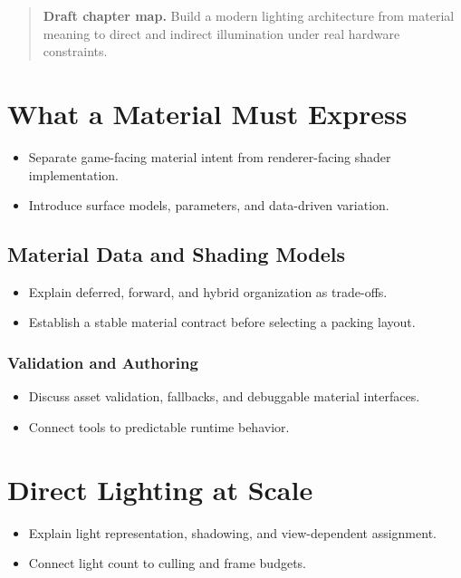 \documentclass[
  11pt,
  letterpaper,
  DIV=11,
  numbers=noendperiod,
  twoside,
  open=right]{scrreprt}
\providecommand{\tightlist}{%
  \setlength{\itemsep}{0pt}\setlength{\parskip}{0pt}}
\begin{document}
\begin{quote}
\textbf{Draft chapter map.} Build a modern lighting architecture from
material meaning to direct and indirect illumination under real hardware
constraints.
\end{quote}

\section{What a Material Must
Express}\label{what-a-material-must-express}

\begin{itemize}
\tightlist
\item
  Separate game-facing material intent from renderer-facing shader
  implementation.
\item
  Introduce surface models, parameters, and data-driven variation.
\end{itemize}

\subsection{Material Data and Shading
Models}\label{material-data-and-shading-models}

\begin{itemize}
\tightlist
\item
  Explain deferred, forward, and hybrid organization as trade-offs.
\item
  Establish a stable material contract before selecting a packing
  layout.
\end{itemize}

\subsubsection{Validation and Authoring}\label{validation-and-authoring}

\begin{itemize}
\tightlist
\item
  Discuss asset validation, fallbacks, and debuggable material
  interfaces.
\item
  Connect tools to predictable runtime behavior.
\end{itemize}

\section{Direct Lighting at Scale}\label{direct-lighting-at-scale}

\begin{itemize}
\tightlist
\item
  Explain light representation, shadowing, and view-dependent
  assignment.
\item
  Connect light count to culling and frame budgets.
\end{itemize}
\end{document}
